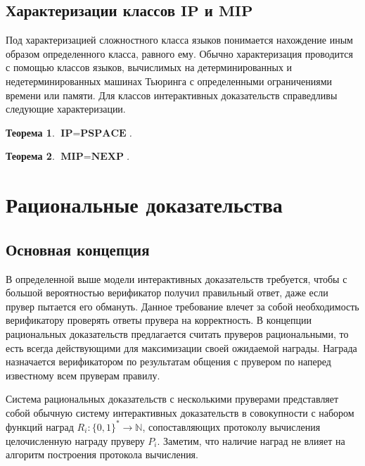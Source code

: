 \documentclass[14pt, a4paper]{extreport}
\newtheorem{theorem}{\indent Теорема}
\newcommand{\word}{\{0, 1\}^*}
\begin{document}
\section{Характеризации классов $\textbf{IP}$ и $\textbf{MIP}$}
Под характеризацией сложностного класса языков понимается нахождение иным образом определенного класса, равного ему. Обычно характеризация проводится с помощью классов языков, вычислимых на детерминированных и недетерминированных машинах Тьюринга с определенными ограничениями времени или памяти. Для классов интерактивных доказательств справедливы следующие характеризации.
\begin{theorem}$\textbf{IP} = \textbf{PSPACE}$.~\cite{shamir1992ip}
\end{theorem}
\begin{theorem}$\textbf{MIP} = \textbf{NEXP}$.~\cite{babai1991mip}\end{theorem}

\chapter{Рациональные доказательства}
\section{Основная концепция}
В определенной выше модели интерактивных доказательств требуется, чтобы с большой вероятностью верификатор получил правильный ответ, даже если прувер пытается его обмануть. Данное требование влечет за собой необходимость верификатору проверять ответы прувера на корректность. В концепции рациональных доказательств предлагается считать пруверов рациональными, то есть всегда действующими для максимизации своей ожидаемой награды. Награда назначается верификатором по результатам общения с прувером по наперед известному всем пруверам правилу. 

Система рациональных доказательств с несколькими пруверами представляет собой обычную систему интерактивных доказательств в совокупности с набором функций наград $R_i: \word \longrightarrow \mathbb{N}$, сопоставляющих протоколу вычисления целочисленную награду пруверу $P_i$. Заметим, что наличие наград не влияет на алгоритм построения протокола вычисления.
\end{document}
